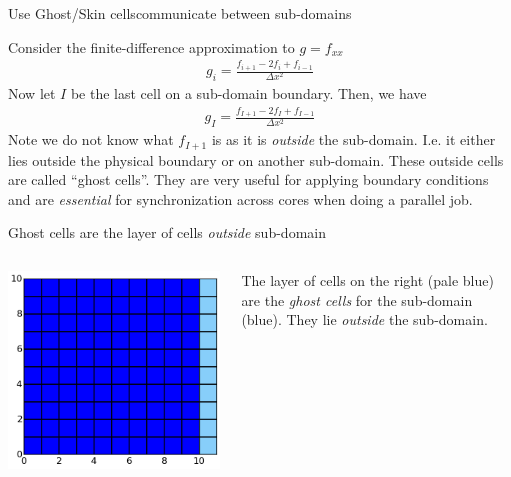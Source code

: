 \documentclass[aspectratio=169]{beamer}
\begin{document}
\begin{frame}{Use Ghost/Skin cellscommunicate between sub-domains}

  Consider the finite-difference approximation to $g=f_{xx}$
  \begin{align*}
    g_i = \frac{f_{i+1}-2 f_{i}+f_{i-1}}{\Delta x^2}
  \end{align*}
  Now let $I$ be the last cell on a sub-domain boundary. Then, we have
  \begin{align*}
    g_I = \frac{f_{I+1}-2 f_{I}+f_{I-1}}{\Delta x^2}
  \end{align*}
  Note we do not know what $f_{I+1}$ is as it is \emph{outside} the
  sub-domain. I.e. it either lies outside the physical boundary or on
  another sub-domain.%
  \vskip0.1in%
  These outside cells are called ``ghost cells''. They are very useful
  for applying boundary conditions and are \emph{essential} for
  synchronization across cores when doing a parallel job.

\end{frame}

\begin{frame}{Ghost cells are the layer of cells \emph{outside}
    sub-domain}

  \begin{columns}
    
    \begin{column}{0.6\linewidth}
      \includegraphics[width=0.9\linewidth]{ghost-cells.png}
    \end{column}
    
    \begin{column}{0.4\linewidth}
      The layer of cells on the right (pale blue) are the \emph{ghost
        cells} for the sub-domain (blue). They lie \emph{outside} the
      sub-domain.
    \end{column}
  \end{columns}

\end{frame}
\end{document}
